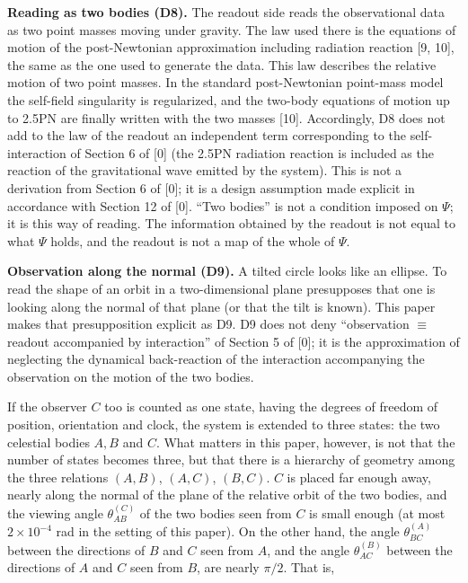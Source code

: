 \documentclass[
  a4paper,
]{article}
\begin{document}
\textbf{Reading as two bodies (D8).} The readout side reads the
observational data as two point masses moving under gravity. The law
used there is the equations of motion of the post-Newtonian
approximation including radiation reaction {[}9, 10{]}, the same as the
one used to generate the data. This law describes the relative motion of
two point masses. In the standard post-Newtonian point-mass model the
self-field singularity is regularized, and the two-body equations of
motion up to 2.5PN are finally written with the two masses {[}10{]}.
Accordingly, D8 does not add to the law of the readout an independent
term corresponding to the self-interaction of Section 6 of {[}0{]} (the
2.5PN radiation reaction is included as the reaction of the
gravitational wave emitted by the system). This is not a derivation from
Section 6 of {[}0{]}; it is a design assumption made explicit in
accordance with Section 12 of {[}0{]}. ``Two bodies'' is not a condition
imposed on \(\Psi\); it is this way of reading. The information obtained
by the readout is not equal to what \(\Psi\) holds, and the readout is
not a map of the whole of \(\Psi\).

\textbf{Observation along the normal (D9).} A tilted circle looks like
an ellipse. To read the shape of an orbit in a two-dimensional plane
presupposes that one is looking along the normal of that plane (or that
the tilt is known). This paper makes that presupposition explicit as D9.
D9 does not deny ``observation \(\equiv\) readout accompanied by
interaction'' of Section 5 of {[}0{]}; it is the approximation of
neglecting the dynamical back-reaction of the interaction accompanying
the observation on the motion of the two bodies.

If the observer \(C\) too is counted as one state, having the degrees of
freedom of position, orientation and clock, the system is extended to
three states: the two celestial bodies \(A, B\) and \(C\). What matters
in this paper, however, is not that the number of states becomes three,
but that there is a hierarchy of geometry among the three relations
\((A,B)\), \((A,C)\), \((B,C)\). \(C\) is placed far enough away, nearly
along the normal of the plane of the relative orbit of the two bodies,
and the viewing angle \(\theta_{AB}^{(C)}\) of the two bodies seen from
\(C\) is small enough (at most \(2\times10^{-4}\) rad in the setting of
this paper). On the other hand, the angle \(\theta_{BC}^{(A)}\) between
the directions of \(B\) and \(C\) seen from \(A\), and the angle
\(\theta_{AC}^{(B)}\) between the directions of \(A\) and \(C\) seen
from \(B\), are nearly \(\pi/2\). That is,
\end{document}
